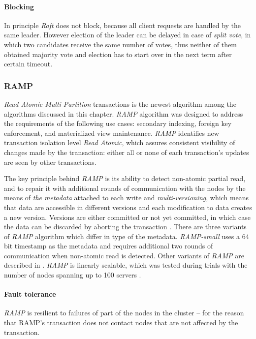 \paragraph{Blocking} In principle \emph{Raft} does not block, because all client requests are handled by the same leader. However election of the leader can be delayed in case of \emph{split vote}, in which two candidates receive the same number of votes, thus neither of them obtained majority vote and election has to start over in the next term after certain timeout.


\subsubsection{RAMP}\label{sec:theory:transactions:ramp}
\emph{Read Atomic Multi Partition} transactions \cite{Bailis:2014} is the newest algorithm among the algorithms discussed in this chapter. 
\emph{RAMP} algorithm was designed to address the requirements of the following use cases: secondary indexing, foreign key
enforcement, and materialized view maintenance.
\emph{RAMP} identifies new transaction isolation level \emph{Read Atomic}, which 
assures consistent visibility of changes made by the transaction: either all or none of each transaction's updates are seen by other transactions.

The key principle behind \emph{RAMP} is its ability to detect non-atomic partial read, and to repair it with
additional rounds of communication with the nodes by the means of \emph{the metadata} attached to each write and
\emph{multi-versioning}, which means that data are accessible in different versions and each modification to data
 creates a new version. Versions are either committed or not yet committed, in which case the data can be discarded by aborting the transaction \cite[p. 6]{Bailis:2014}.
There are three variants of \emph{RAMP} algorithm which differ in type of the metadata. \emph{RAMP-small} uses a 64 bit timestamp as the metadata and requires additional two rounds of communication when non-atomic read is detected. Other variants of \emph{RAMP} are described in \cite[p. 5]{Bailis:2014}.
\emph{RAMP} is linearly scalable, which was tested during trials with the number of nodes spanning up to 100 servers \cite[p. 10]{Bailis:2014}.

\paragraph{Fault tolerance} \emph{RAMP} is resilient to failures of part of the nodes in the cluster -- for the reason that RAMP's transaction does not contact nodes that are not affected by the transaction. 

